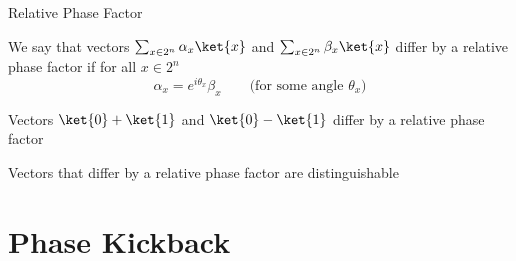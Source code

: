 \documentclass{beamer}
\begin{document}
\begin{frame}{Relative Phase Factor}
        
        \begin{definition}
        We say that vectors $\sum_{x \in 2^n} \alpha_x \ket{x}$ and $\sum_{x
        \in 2^n} \beta_x \ket{x}$ differ by a \alert{relative phase factor} if
        for all $x \in 2^n$
        \[
                \alpha_x = e^{i \theta_x} \beta_x
                \qquad \text{(for some angle $\theta_x$)}
        \]
        \end{definition}       

        \begin{example}
               Vectors $\ket{0} + \ket{1}$ and $\ket{0} - \ket{1}$
                differ by a relative phase factor
        \end{example}

        \pause
        Vectors that differ by a relative phase factor are \alert{distinguishable}
\end{frame}

\section{Phase Kickback}
\end{document}
